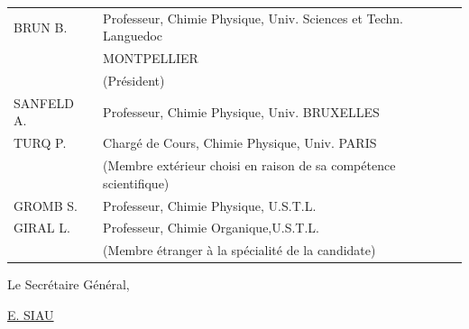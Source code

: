 \begin{tabular}{lp{.74\linewidth}}
BRUN B. & Professeur, Chimie Physique, Univ. Sciences et Techn. Languedoc\\
& MONTPELLIER\\
& (Président)\\
SANFELD A. & Professeur, Chimie Physique, Univ. BRUXELLES\\
TURQ P. & Chargé de Cours, Chimie Physique, Univ. PARIS\\
& (Membre extérieur choisi en raison de sa compétence scientifique)\\
GROMB S. & Professeur, Chimie Physique, U.S.T.L.\\
GIRAL L. & Professeur, Chimie Organique,U.S.T.L.\\
& (Membre étranger à la spécialité de la candidate)
\end{tabular}
Le Secrétaire Général,


\uline{E. SIAU}
